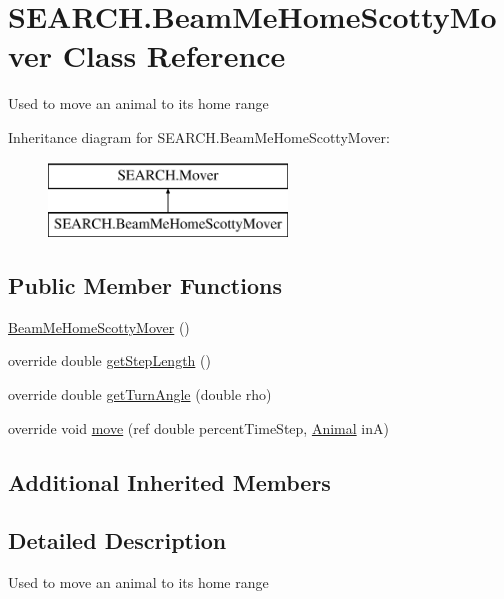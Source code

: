 \hypertarget{class_s_e_a_r_c_h_1_1_beam_me_home_scotty_mover}{\section{S\-E\-A\-R\-C\-H.\-Beam\-Me\-Home\-Scotty\-Mover Class Reference}
\label{class_s_e_a_r_c_h_1_1_beam_me_home_scotty_mover}
}


Used to move an animal to its home range  


Inheritance diagram for S\-E\-A\-R\-C\-H.\-Beam\-Me\-Home\-Scotty\-Mover\-:\begin{figure}[H]
\begin{center}
\leavevmode
\includegraphics[height=2.000000cm]{class_s_e_a_r_c_h_1_1_beam_me_home_scotty_mover}
\end{center}
\end{figure}
\subsection*{Public Member Functions}
\begin{DoxyCompactItemize}
\item 
\hyperlink{class_s_e_a_r_c_h_1_1_beam_me_home_scotty_mover_a3f982f1b6d6733eef1de5f6fe6b3a6c1}{Beam\-Me\-Home\-Scotty\-Mover} ()
\item 
override double \hyperlink{class_s_e_a_r_c_h_1_1_beam_me_home_scotty_mover_a93c92d2db0bb4df1703a5f4f38c2eb02}{get\-Step\-Length} ()
\item 
override double \hyperlink{class_s_e_a_r_c_h_1_1_beam_me_home_scotty_mover_ae8123c9563cd5149d6ce679fe4b13357}{get\-Turn\-Angle} (double rho)
\item 
override void \hyperlink{class_s_e_a_r_c_h_1_1_beam_me_home_scotty_mover_aae251857ff44aea02591128c50a16e96}{move} (ref double percent\-Time\-Step, \hyperlink{class_s_e_a_r_c_h_1_1_animal}{Animal} in\-A)
\end{DoxyCompactItemize}
\subsection*{Additional Inherited Members}


\subsection{Detailed Description}
Used to move an animal to its home range 



